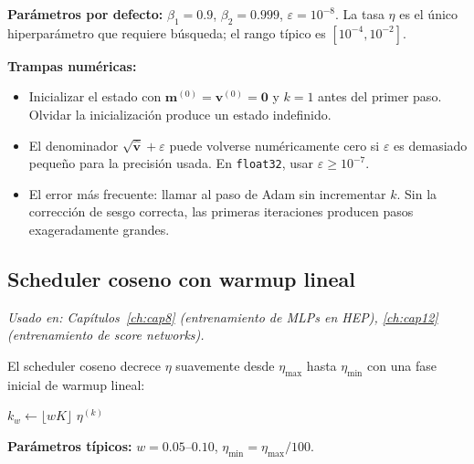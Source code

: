 \medskip
\noindent\textbf{Parámetros por defecto:}
$\beta_1 = 0.9$, $\beta_2 = 0.999$, $\varepsilon = 10^{-8}$.
La tasa $\eta$ es el único hiperparámetro que requiere búsqueda; el rango
típico es $[10^{-4}, 10^{-2}]$.

\medskip
\noindent\textbf{Trampas numéricas:}
\begin{itemize}
  \item Inicializar el estado con $\bm{m}^{(0)} = \bm{v}^{(0)} = \bm{0}$ y
        $k = 1$ antes del primer paso. Olvidar la inicialización produce un
        estado indefinido.
  \item El denominador $\sqrt{\hat{\bm{v}}} + \varepsilon$ puede volverse
        numéricamente cero si $\varepsilon$ es demasiado pequeño para la
        precisión usada. En \texttt{float32}, usar $\varepsilon \geq 10^{-7}$.
  \item El error más frecuente: llamar al paso de Adam sin incrementar $k$.
        Sin la corrección de sesgo correcta, las primeras iteraciones producen
        pasos exageradamente grandes.
\end{itemize}

\subsection{Scheduler coseno con warmup lineal}
\label{subsec:ap_scheduler}

\textit{Usado en: Capítulos~\ref{ch:cap8} (entrenamiento de MLPs en HEP),
\ref{ch:cap12} (entrenamiento de score networks).}

\medskip
El scheduler coseno decrece $\eta$ suavemente desde $\eta_{\max}$ hasta
$\eta_{\min}$ con una fase inicial de warmup lineal:

\begin{algorithm}[H]
\caption{Scheduler coseno con warmup lineal}
\label{alg:ap_scheduler}

$k_w \leftarrow \lfloor wK \rfloor$
\Return $\eta^{(k)}$\;
\end{algorithm}

\noindent\textbf{Parámetros típicos:} $w = 0.05$--$0.10$, $\eta_{\min} =
\eta_{\max}/100$.

